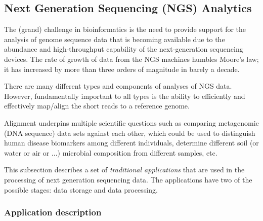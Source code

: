 
\subsection{Next Generation Sequencing (NGS) Analytics \label{bioSilvia}}

The (grand) challenge in bioinformatics is the need to provide support
for the analysis of genome sequence data that is becoming available
due to the abundance and high-throughput capability of the
next-generation sequencing devices. The rate of growth of data from
the NGS machines humbles Moore's law; it has increased by more than
three orders of magnitude in barely a decade.

There are many different types and components of analyses of NGS data.
However, fundamentally important to all types is the ability to
efficiently and effectively map/align the short reads to a reference
genome.

Alignment underpins multiple scientific questions such as comparing
metagenomic (DNA sequence) data sets against each other, which could
be used to distinguish human disease biomarkers among different
individuals, determine different soil (or water or air or ...)
microbial composition from different samples, etc.

This subsection describes a set of {\em traditional applications} that
are used in the processing of next generation sequencing data.  The
applications have two of the possible stages: data storage and data
processing.

\subsubsection*{Application description}


